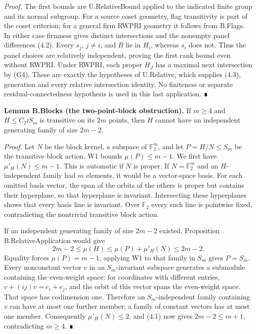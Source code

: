 \documentclass[
  11pt,
  a4paper,
]{article}
\begin{document}
\emph{Proof.} The first bounds are U.RelativeBound applied to the
indicated finite group and its normal subgroup. For a source coset
geometry, flag transitivity is part of the coset criterion; for a
general firm RWPRI geometry it follows from B.Flags. In either case
firmness gives distinct intersections and the nonempty panel differences
(4.2). Every \(s_j\), \(j\ne i\), and \(B\) lie in \(H_i\), whereas
\(s_i\) does not. Thus the panel choices are relatively independent,
proving the first rank bound even without RWPRI. Under RWPRI, each
proper \(H_J\) has a maximal next intersection by (G4). These are
exactly the hypotheses of U.Relative, which supplies (4.3), generation
and every relative intersection identity. No finiteness or separate
residual-connectedness hypothesis is used in this last application. ∎

\textbf{Lemma B.Blocks (the two-point-block obstruction).} If \(m\geq4\)
and \(H\leq C_2\wr S_m\) is transitive on its \(2m\) points, then \(H\)
cannot have an independent generating family of size \(2m-2\).

\emph{Proof.} Let \(N\) be the block kernel, a subspace of
\(\mathbb F_2^m\), and let \(P=H/N\leq S_m\) be the transitive block
action. W1 bounds \(\mu(P)\leq m-1\). We first have
\(\mu'_H(N)\leq m-1\). This is automatic if \(N\) is proper. If
\(N=\mathbb F_2^m\) and an \(H\)-independent family had \(m\) elements,
it would be a vector-space basis. For each omitted basis vector, the
span of the orbits of the others is proper but contains their
hyperplane, so that hyperplane is invariant. Intersecting these
hyperplanes shows that every basis line is invariant. Over
\(\mathbb F_2\) every such line is pointwise fixed, contradicting the
nontrivial transitive block action.

If an independent generating family of size \(2m-2\) existed,
Proposition B.RelativeApplication would give \[
2m-2\leq\mu(H)\leq\mu(P)+\mu'_H(N)\leq2m-2.
\] Equality forces \(\mu(P)=m-1\); applying W1 to that family in \(S_m\)
gives \(P=S_m\). Every nonconstant vector \(v\) in an \(S_m\)-invariant
subspace generates a submodule containing the even-weight space: for
coordinates with different entries, \(v+(ij)v=e_i+e_j\), and the orbit
of this vector spans the even-weight space. That space has codimension
one. Therefore an \(S_m\)-independent family containing \(v\) can have
at most one further member; a family of constant vectors has at most one
member. Consequently \(\mu'_H(N)\leq2\), and (4.1) now gives
\(2m-2\leq m+1\), contradicting \(m\geq4\). ∎
\end{document}
